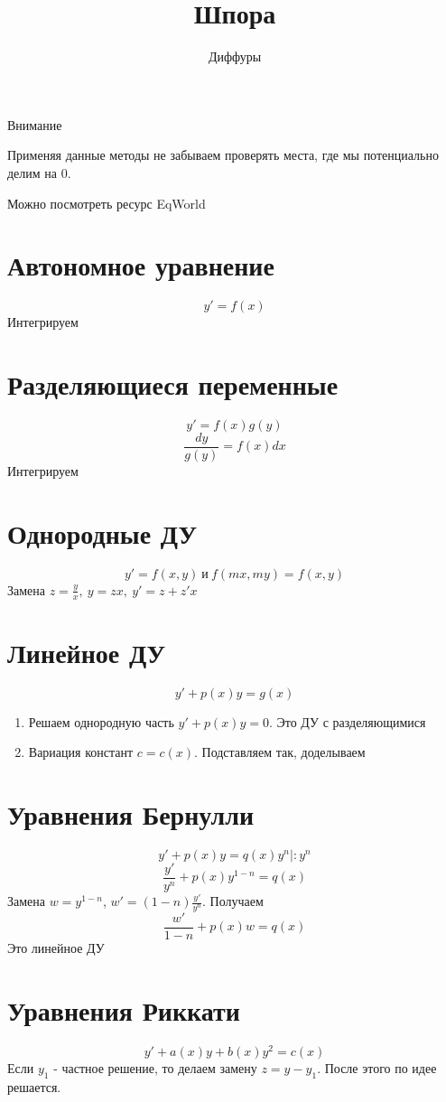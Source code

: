\documentclass[11pt]{article}
\title{Шпора}
\author{Диффуры}
\date{}
\begin{document}
	\maketitle
	\tableofcontents
	\begin{center}
		Внимание
	\end{center}

	Применяя данные методы не забываем проверять места, где мы потенциально делим на 0.
	
	Можно посмотреть ресурс EqWorld

	\section{Автономное уравнение}
	$$y' = f(x)$$
	Интегрируем

	\section{Разделяющиеся переменные}
	$$y' = f(x)g(y)$$
	$$\frac{dy}{g(y)} = f(x)dx$$
	Интегрируем

	\section{Однородные ДУ}
	$$y' = f(x, y) \ \text{и} \ f(mx, my) = f(x, y)$$
	Замена $z = \frac{y}{x},\ y = zx,\ y' = z + z'x$

	\section{Линейное ДУ}
	$$y' + p(x)y= g(x)$$
	\begin{enumerate}
		\item Решаем однородную часть $y' + p(x)y = 0$. Это ДУ с разделяющимися
		\item Вариация констант $c = c(x)$. Подставляем так, доделываем
	\end{enumerate}

	\section{Уравнения Бернулли}
	$$y' +p(x) y = q(x)y^n | :y^n$$
	$$\frac{y'}{y^n} + p(x)y^{1-n} = q(x)$$
	Замена $w = y^{1-n}$, $w' = (1-n)\frac{y'}{y^n}$. Получаем
	$$\frac{w'}{1-n} + p(x)w = q(x)$$
	Это линейное ДУ
	

	\section{Уравнения Риккати}
	$$y' +a(x) y + b(x)y^2 = c(x)$$
	Если $y_1$ - частное решение, то делаем замену $z = y-y_1$. После этого по идее решается.
\end{document}

